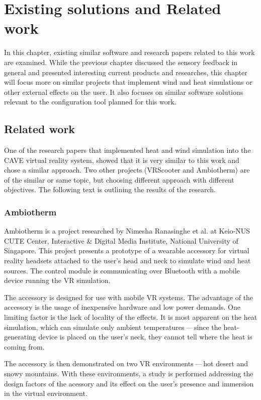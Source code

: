 \chapter{Existing solutions and Related work}

In this chapter, existing similar software and research papers related to this
work are examined. While the previous chapter discussed the sensory feedback in
general and presented interesting current products and researches, this
chapter will focus more on similar projects that implement wind and heat simulations
or other external effects on the user. It also focuses on similar software
solutions relevant to the configuration tool planned for this work.


\hypertarget{x-related-work}{\section{Related work}}
One of the research papers that implemented heat and wind simulation into the
CAVE virtual reality system,
showed that it is very similar to this work and chose a similar approach. Two
other projects (VRScooter and Ambiotherm) are of the similar or same topic,
but choosing different approach with different objectives.
The following text is outlining the results of the research.


\hypertarget{x-ambiotherm}{\subsection{Ambiotherm}}
Ambiotherm is a project researched by Nimesha Ranasinghe et al. at Keio-NUS
CUTE Center, Interactive \& Digital Media Institute, National University of
Singapore. This project presents a prototype of a wearable accessory for virtual
reality headsets attached to the user’s head and neck to simulate wind
and heat sources. \cite{ambiotherm} 
The control module is communicating over Bluetooth with
a mobile device running the VR simulation.


The accessory is designed for use with mobile VR systems.
The advantage of the accessory is the usage of inexpensive hardware and low power
demands. One limiting factor is the lack of locality of the effects.
It is most apparent on the heat simulation, which can simulate
only ambient temperatures — since the heat-generating device is
placed on the user’s neck, they cannot tell where the heat is coming from.


The accessory is then demonstrated on two VR environments — hot desert and
snowy mountains. With these environments, a study is performed addressing the
design factors of the acessory and its effect on the user’s presence
and immersion in the virtual environment.


